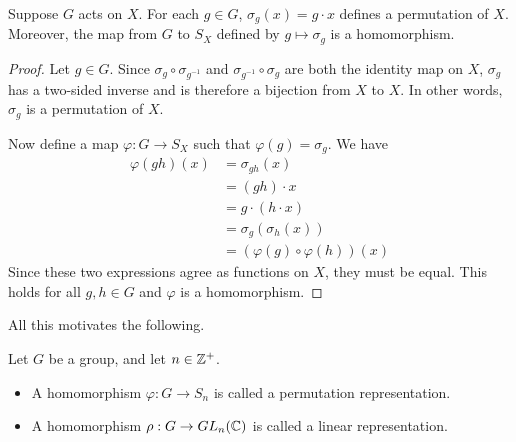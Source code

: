 \documentclass[../m171main.tex]{subfiles}
\begin{document}

\begin{theorem}[]
    Suppose $G$ acts on $X$.
    For each $g \in G$, $\sigma_g(x) = g \cdot x$ defines a permutation of $X$.
    Moreover, the map from $G$ to $S_X$ defined by $g \mapsto \sigma_g$ is a homomorphism.
\end{theorem}

\begin{proof}
    Let $g \in G$.
    Since $\sigma_g \circ \sigma_{g^{-1}}$ and $\sigma_{g^{-1}} \circ \sigma_g$ are both the identity map on $X$, $\sigma_g$ has a two-sided inverse and is therefore a bijection from $X$ to $X$.
    In other words, $\sigma_g$ is a permutation of $X$.     %

    Now define a map $\varphi : G \to S_X$ such that $\varphi(g) = \sigma_g$.
    We have
    \begin{align*}
        \varphi(gh) (x) &= \sigma_{gh}(x) \\
        &= (gh) \cdot x \\
        &= g \cdot (h \cdot x) \\
        &= \sigma_g (\sigma_h (x)) \\
        &= \left( \varphi(g) \circ \varphi(h) \right)(x)
    \end{align*}
    Since these two expressions agree as functions on $X$, they must be equal.
    This holds for all $g,h \in G$ and $\varphi$ is a homomorphism.
\end{proof}


All this motivates the following.

\begin{definition}[Representation]
    Let $G$ be a group, and let $n \in \mathbb{Z}^+$.
    \begin{itemize}
        \item A homomorphism $\varphi : G \to S_n$ is called a permutation representation.
        \item A homomorphism $\rho : G \to GL_n(\mathbb{C})$ is called a linear representation.
    \end{itemize}
    
\end{definition}
\end{document}
